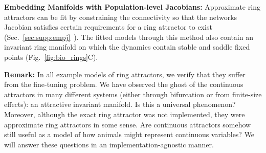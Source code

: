 \documentclass{article} %
\newcommand{\ptitle}[1]{\textbf{#1:}\xspace}
\newcommand{\mpcomment}[1]{\textcolor{mpcolor}{(#1)}}
\newcounter{ct}
\theoremstyle{definition}
\theoremstyle{remark}
\begin{document}
\ptitle{Embedding Manifolds with Population-level Jacobians} %
Approximate ring attractors can be fit by constraining the connectivity so that the networks Jacobian satisfies certain requirements for a ring attractor to exist (Sec.~\ref{sec:supp:empj}~\citep{pollock2020}).
The fitted models through this method also contain an invariant ring manifold on which the dynamics contain stable and saddle fixed points (Fig.~\ref{fig:bio_rings}C).

\ptitle{Remark}
In all example models of ring attractors, we verify that they suffer from the fine-tuning problem.
We have observed the ghost of the continuous attractors in many different systems (either through bifurcation or from finite-size effects): an attractive invariant manifold.
Is this a universal phenomenon?
Moreover, although the exact ring attractor was not implemented, they were approximate ring attractors in some sense.
Are continuous attractors somehow still useful as a model of how animals might represent continuous variables?
We will answer these questions in an implementation-agnostic manner.



\end{document}
